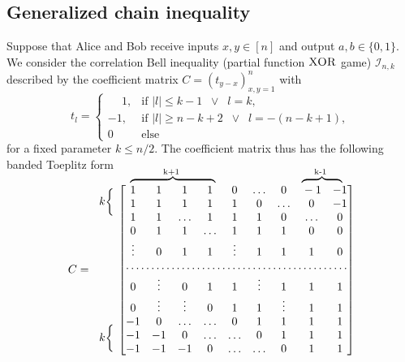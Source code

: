 \documentclass[pra,twocolumn,showpacs,preprintnumbers,amsmath,amssymb,superscriptaddress]{revtex4-1}
\newcommand\bovermat[2]{%
  \makebox[0pt][l]{$\smash{\overbrace{\phantom{%
    \begin{matrix}#2\end{matrix}}}^{\text{#1}}}$}#2}
\begin{document}
\begin{appendix}
\section{Generalized chain inequality}\label{secGCHAIN}
Suppose that Alice and Bob receive inputs $x, y \in [n]$ and output $a, b \in \{0,1\}$. We consider the correlation Bell inequality (partial function $\textsc{XOR}$ game) $\mathcal{I}_{n,k}$ described by the coefficient matrix $C = (t_{y-x})_{x,y=1}^n$ with
\begin{equation}
\label{eq:gen-ch}
t_l =
\begin{cases}
\phantom{-} 1,
& \text{if } \vert l \vert \leq k -1 \; \; \vee \; \; l = k,\\
-1, & \text{if } \vert l \vert \geq n-k+2 \; \; \vee \; \; l = -(n-k+1), \\
0 & \text{else}
\end{cases}
\end{equation}
for a fixed parameter $k \leq n/2$. The coefficient matrix thus has the following banded Toeplitz form

\begin{equation}
C=
\begin{array}{l}
  \ldelim\{{2}{0mm}[$k$] \\ \\ \\ \\ \\ \\\\ \\ \\  \\[0mm]  \ldelim\{{2}{4mm}[$k$] \\ \    \end{array} \\[-1ex]
\begin{bmatrix}
\bovermat{k+1 }{1 & 1  & 1 & 1 &0 &} \ldots & 0 & \bovermat{k-1 }{-1 & -1}\\
1 & 1  & 1 & 1 & 1 & 0 & \ldots & 0 & -1\\
1 & 1 & \ldots   & 1 & 1 & 1 & 0 & \ldots & 0\\
0 & 1 & 1 & \ldots  & 1 & 1 & 1 & 0 & 0\\
\vdots & 0 & 1 & 1 & \vdots & 1 & 1 & 1 & 0 \\
\hdotsfor{9}\cr 0 & \vdots & 0 & 1 & 1 & \vdots & 1 & 1 & 1 \\
0 & \vdots & \vdots & 0 & 1 & 1 & \vdots &1 &1  \\
-1 &0 & \ldots & \ldots & 0 & 1 & 1 & 1 & 1\\
-1 & -1 & 0 & \ldots & \ldots & 0 & 1 & 1 & 1\\
-1 & -1 & -1 & 0 & \ldots & \ldots & 0 & 1 & 1
\end{bmatrix} 
\end{equation}


\end{appendix}
\end{document}
